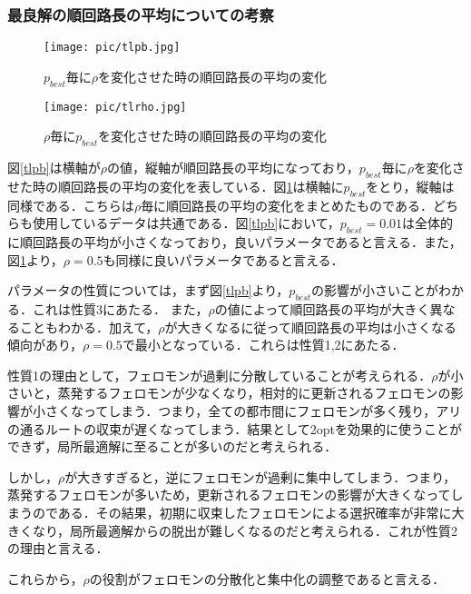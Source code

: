 \documentclass[a4j]{jsarticle}
\begin{document}
\subsubsection{最良解の順回路長の平均についての考察}

\begin{figure}[htb]
 \begin{minipage}{0.5\hsize}
  \begin{center}
   \texttt{[image: pic/tlpb.jpg]}
  \end{center}
  \caption{$p_{best}$毎に$\rho$を変化させた時の順回路長の平均の変化}
  \label{tlpb}
 \end{minipage}
 \begin{minipage}{0.5\hsize}
  \begin{center}
   \texttt{[image: pic/tlrho.jpg]}
  \end{center}
  \caption{$\rho$毎に$p_{best}$を変化させた時の順回路長の平均の変化}
  \label{tlrho}
 \end{minipage}
\end{figure}

図\ref{tlpb}は横軸が$\rho$の値，縦軸が順回路長の平均になっており，$p_{best}$毎に$\rho$を変化させた時の順回路長の平均の変化を表している．図\ref{tlrho}は横軸に$p_{best}$をとり，縦軸は同様である．こちらは$\rho$毎に順回路長の平均の変化をまとめたものである．どちらも使用しているデータは共通である．図\ref{tlpb}において，$p_{best} = 0.01$は全体的に順回路長の平均が小さくなっており，良いパラメータであると言える．また，図\ref{tlrho}より，$\rho = 0.5$も同様に良いパラメータであると言える．
\par
パラメータの性質については，まず図\ref{tlpb}より，$p_{best}$の影響が小さいことがわかる．これは性質3にあたる．
また，$\rho$の値によって順回路長の平均が大きく異なることもわかる．加えて，$\rho$が大きくなるに従って順回路長の平均は小さくなる傾向があり，$\rho=0.5$で最小となっている．これらは性質1,2にあたる．
\par
性質1の理由として，フェロモンが過剰に分散していることが考えられる．$\rho$が小さいと，蒸発するフェロモンが少なくなり，相対的に更新されるフェロモンの影響が小さくなってしまう．つまり，全ての都市間にフェロモンが多く残り，アリの通るルートの収束が遅くなってしまう．結果として2optを効果的に使うことができず，局所最適解に至ることが多いのだと考えられる．
\par
しかし，$\rho$が大きすぎると，逆にフェロモンが過剰に集中してしまう．つまり，蒸発するフェロモンが多いため，更新されるフェロモンの影響が大きくなってしまうのである．その結果，初期に収束したフェロモンによる選択確率が非常に大きくなり，局所最適解からの脱出が難しくなるのだと考えられる．これが性質2の理由と言える．
\par
これらから，$\rho$の役割がフェロモンの分散化と集中化の調整であると言える．
\end{document}
